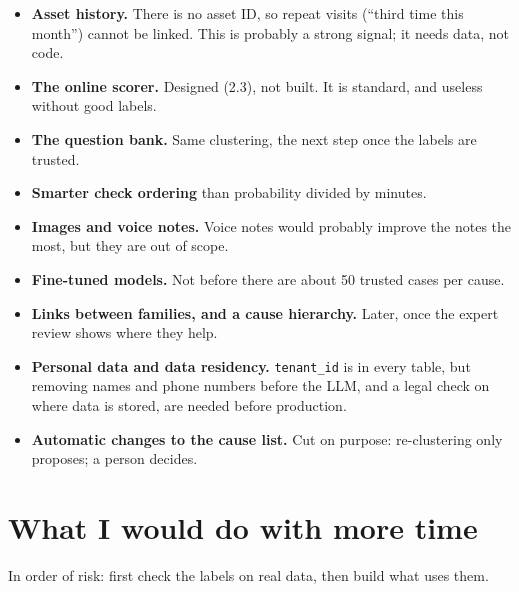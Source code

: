\documentclass[11pt,a4paper]{article}
\newcommand{\code}[1]{\nolinkurl{#1}}
\begin{document}
\begin{itemize}[itemsep=0.3em]
  \item \textbf{Asset history.} There is no asset ID, so repeat visits (“third time this month”) cannot be linked. This is probably a strong signal; it needs data, not code.
  \item \textbf{The online scorer.} Designed (2.3), not built. It is standard, and useless without good labels.
  \item \textbf{The question bank.} Same clustering, the next step once the labels are trusted.
  \item \textbf{Smarter check ordering} than probability divided by minutes.
  \item \textbf{Images and voice notes.} Voice notes would probably improve the notes the most, but they are out of scope.
  \item \textbf{Fine-tuned models.} Not before there are about 50 trusted cases per cause.
  \item \textbf{Links between families, and a cause hierarchy.} Later, once the expert review shows where they help.
  \item \textbf{Personal data and data residency.} \code{tenant_id} is in every table, but removing names and phone numbers before the LLM, and a legal check on where data is stored, are needed before production.
  \item \textbf{Automatic changes to the cause list.} Cut on purpose: re-clustering only proposes; a person decides.
\end{itemize}

\section{What I would do with more time}\label{sec:next}

In order of risk: first check the labels on real data, then build what uses them.
\end{document}

